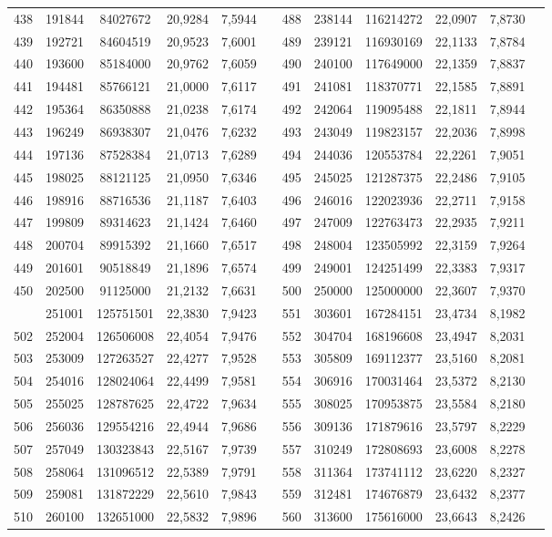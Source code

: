 \begin{longtable}{p{.17\linewidth}*{11}{S}}
438&191844&84027672&20,9284&7,5944&&488&238144&116214272&22,0907&7,8730\\
439&192721&84604519&20,9523&7,6001&&489&239121&116930169&22,1133&7,8784\\
440&193600&85184000&20,9762&7,6059&&490&240100&117649000&22,1359&7,8837\\
441&194481&85766121&21,0000&7,6117&&491&241081&118370771&22,1585&7,8891\\
442&195364&86350888&21,0238&7,6174&&492&242064&119095488&22,1811&7,8944\\
443&196249&86938307&21,0476&7,6232&&493&243049&119823157&22,2036&7,8998\\
444&197136&87528384&21,0713&7,6289&&494&244036&120553784&22,2261&7,9051\\
445&198025&88121125&21,0950&7,6346&&495&245025&121287375&22,2486&7,9105\\
446&198916&88716536&21,1187&7,6403&&496&246016&122023936&22,2711&7,9158\\
447&199809&89314623&21,1424&7,6460&&497&247009&122763473&22,2935&7,9211\\
448&200704&89915392&21,1660&7,6517&&498&248004&123505992&22,3159&7,9264\\
449&201601&90518849&21,1896&7,6574&&499&249001&124251499&22,3383&7,9317\\
450&202500&91125000&21,2132&7,6631&&500&250000&125000000&22,3607&7,9370\\
&251001&125751501&22,3830&7,9423&&551&303601&167284151&23,4734&8,1982\\
502&252004&126506008&22,4054&7,9476&&552&304704&168196608&23,4947&8,2031\\
503&253009&127263527&22,4277&7,9528&&553&305809&169112377&23,5160&8,2081\\
504&254016&128024064&22,4499&7,9581&&554&306916&170031464&23,5372&8,2130\\
505&255025&128787625&22,4722&7,9634&&555&308025&170953875&23,5584&8,2180\\
506&256036&129554216&22,4944&7,9686&&556&309136&171879616&23,5797&8,2229\\
507&257049&130323843&22,5167&7,9739&&557&310249&172808693&23,6008&8,2278\\
508&258064&131096512&22,5389&7,9791&&558&311364&173741112&23,6220&8,2327\\
509&259081&131872229&22,5610&7,9843&&559&312481&174676879&23,6432&8,2377\\
510&260100&132651000&22,5832&7,9896&&560&313600&175616000&23,6643&8,2426\\

\end{longtable}

